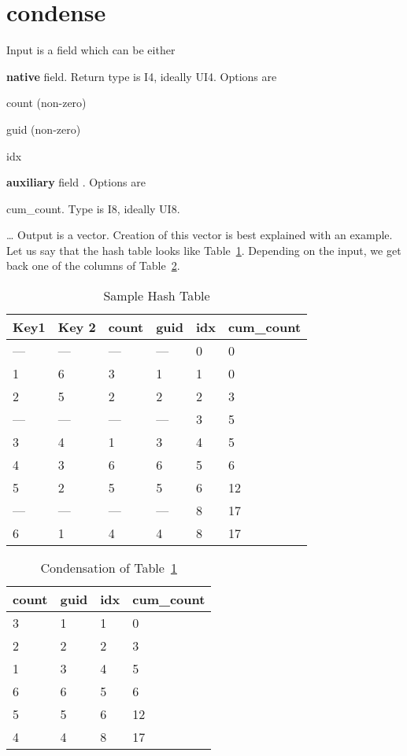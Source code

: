 \section{condense}
\label{condense}
Input is a field which can be either 
\be
\item {\bf native} field. Return type is I4, ideally UI4. Options are 
\be
\item count (non-zero)
\item guid (non-zero)
\item idx
\ee
\item {\bf auxiliary} field . Options are 
\be
\item cum\_count. Type is I8, ideally UI8.
\item \ldots
\ee
\ee
Output is a vector. Creation of this vector is 
best explained with an example. Let us say that the hash table looks like
Table~\ref{hash_tbl_1}. Depending on the input, we get back one of the columns
of Table~\ref{condensed_hash_tbl_1}.
\begin{table}
\centering
\begin{tabular}{|l|l||l|l|l||l|} \hline \hline 
{\bf Key1 } & {\bf Key 2} & {\bf count} & 
{\bf guid} & {\bf idx} & {\bf cum\_count} \\ \hline \hline
--- & --- & --- & --- &  0 & 0  \\ \hline
  1 &  6  &  3  &  1  &  1 & 0  \\ \hline
  2 &  5  &  2  &  2  &  2 & 3  \\ \hline
--- & --- & --- & --- &  3 & 5  \\ \hline
  3 &  4  &  1  &  3  &  4 & 5  \\ \hline
  4 &  3  &  6  &  6  &  5 & 6  \\ \hline
  5 &  2  &  5  &  5  &  6 & 12  \\ \hline
--- & --- & --- & --- &  8 & 17  \\ \hline
  6 &  1  &  4  &  4  &  8 & 17  \\ \hline
\hline
\end{tabular}
\caption{Sample Hash Table}
\label{hash_tbl_1}
\end{table}

\begin{table}
\centering
\begin{tabular}{|l|l|l||l|} \hline \hline 
count & guid & idx & cum\_count \\ \hline \hline
  3  &  1  &  1 & 0 \\ \hline
  2  &  2  &  2 & 3 \\ \hline
  1  &  3  &  4 & 5 \\ \hline
  6  &  6  &  5 & 6 \\ \hline
  5  &  5  &  6 & 12 \\ \hline
  4  &  4  &  8 & 17 \\ \hline
\hline
\end{tabular}
\caption{Condensation of Table~\ref{hash_tbl_1}}
\label{condensed_hash_tbl_1}
\end{table}

